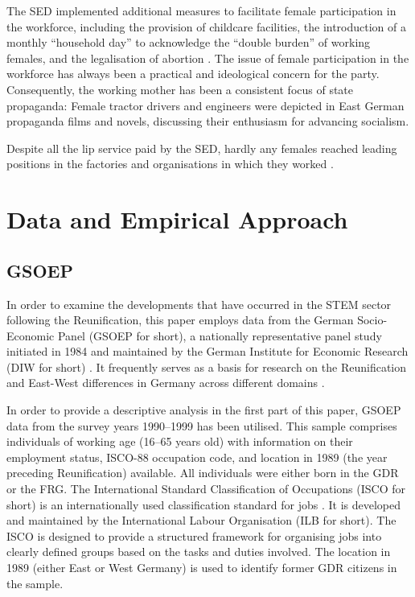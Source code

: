 \documentclass[a4paper, oneside, hyperfootnotes = false]{article}
\begin{document}
{%
The SED implemented additional measures to facilitate female participation in the workforce, including the provision of childcare facilities, the introduction of a monthly ``household day'' to acknowledge the ``double burden'' of working females, and the legalisation of abortion \citep{Budde1999}.
The issue of female participation in the workforce has always been a practical and ideological concern for the party.
Consequently, the working mother has been a consistent focus of state propaganda:
Female tractor drivers and engineers were depicted in East German propaganda films and novels, discussing their enthusiasm for advancing socialism.

Despite all the lip service paid by the SED, hardly any females reached leading positions in the factories and organisations in which they worked \citep{Ross2017, Frauenreport1990}.

\section{Data and Empirical Approach}
\label{dataemp}

\subsection{GSOEP}
\label{gsoep}

In order to examine the developments that have occurred in the STEM sector following the Reunification, this paper employs data from the German Socio-Economic Panel (GSOEP for short), a nationally representative panel study initiated in 1984 and maintained by the German Institute for Economic Research (DIW for short) \citep{Siegers2022}.
It frequently serves as a basis for research on the Reunification and East-West differences in Germany across different domains \citep{Petrunyk2016, Bird1994, Hadjar2010}.

In order to provide a descriptive analysis in the first part of this paper, GSOEP data from the survey years 1990–1999 has been utilised.
This sample comprises individuals of working age (16–65 years old) with information on their employment status, ISCO-88 occupation code, and location in 1989 (the year preceding Reunification) available.
All individuals were either born in the GDR or the FRG.
The International Standard Classification of Occupations (ISCO for short) is an internationally used classification standard for jobs \citep{Elias1997}.
It is developed and maintained by the International Labour Organisation (ILB for short).
The ISCO is designed to provide a structured framework for organising jobs into clearly defined groups based on the tasks and duties involved.
The location in 1989 (either East or West Germany) is used to identify former GDR citizens in the sample.

}
\end{document}
